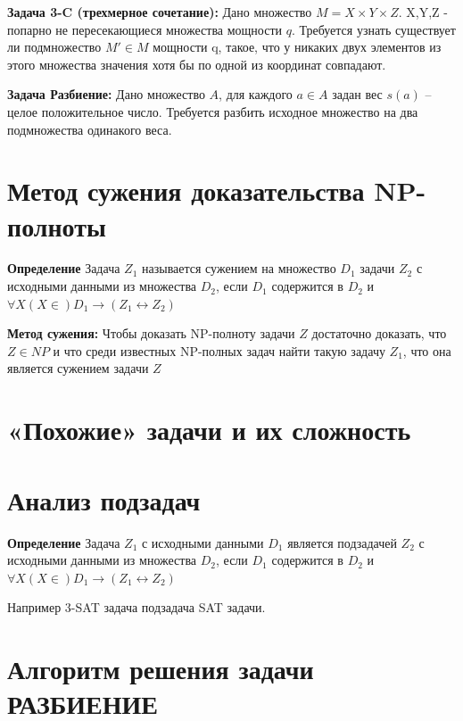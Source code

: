 \documentclass[40pt]{article}
\begin{document}
\par \textbf{Задача 3-C (трехмерное сочетание):} Дано множество $M = X \times Y \times Z$. X,Y,Z - попарно не пересекающиеся множества мощности $q$. Требуется узнать существует ли подмножество $M' \in M$ мощности q, такое, что у никаких двух элементов из этого множества значения хотя бы по одной из координат совпадают.
 
 
    \par \textbf{Задача Разбиение:} Дано множество $A$, для каждого $a \in A$ задан вес $s(a)$ -- целое положительное число.
    Требуется разбить исходное множество на два подмножества одинакого веса.
    
    
\section{Метод сужения доказательства NP-полноты}


\par \textbf{Определение} Задача $Z_1$ называется сужением на множество $D_1$ задачи $Z_2$ с исходными данными из множества $D_2$, если $D_1$ содержится в $D_2$ и $\forall X(X\in) D_1 \rightarrow (Z_1 \leftrightarrow Z_2)$ 
 
	\par \textbf{Метод сужения:} Чтобы доказать NP-полноту задачи $Z$ достаточно доказать, что $Z \in NP$ и что среди известных NP-полных задач найти такую задачу $Z_1$, что она является сужением задачи $Z$
	
\section{«Похожие» задачи и их сложность}

\section{Анализ подзадач}

\par \textbf{Определение} Задача $Z_1$ с исходными данными $D_1$ является подзадачей $Z_2$ с исходными данными из множества $D_2$, если $D_1$ содержится в $D_2$ и $\forall X(X\in) D_1 \rightarrow (Z_1 \leftrightarrow Z_2)$ 
 
     \par Например 3-SAT задача подзадача SAT задачи.
     
\section{Алгоритм решения задачи РАЗБИЕНИЕ}
\end{document}

